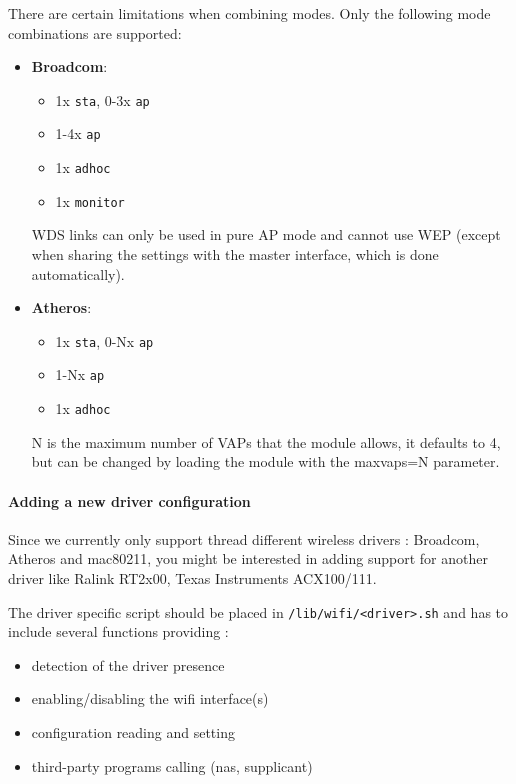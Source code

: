 There are certain limitations when combining modes.
Only the following mode combinations are supported:

\begin{itemize}
    \item \textbf{Broadcom}: \\
        \begin{itemize}
            \item 1x \texttt{sta}, 0-3x \texttt{ap}
            \item 1-4x \texttt{ap}
            \item 1x \texttt{adhoc}
            \item 1x \texttt{monitor}
        \end{itemize}

        WDS links can only be used in pure AP mode and cannot use WEP (except when sharing the
        settings with the master interface, which is done automatically).

    \item \textbf{Atheros}: \\
        \begin{itemize}
            \item 1x \texttt{sta}, 0-Nx \texttt{ap}
            \item 1-Nx \texttt{ap}
            \item 1x \texttt{adhoc}
        \end{itemize}

	N is the maximum number of VAPs that the module allows, it defaults to 4, but can be
	changed by loading the module with the maxvaps=N parameter.
\end{itemize}

\paragraph{Adding a new driver configuration}

Since we currently only support thread different wireless drivers : Broadcom, Atheros and mac80211,
you might be interested in adding support for another driver like Ralink RT2x00, 
Texas Instruments ACX100/111.

The driver specific script should be placed in \texttt{/lib/wifi/<driver>.sh} and has to
include several functions providing :

\begin{itemize}
	\item detection of the driver presence
	\item enabling/disabling the wifi interface(s)
	\item configuration reading and setting
	\item third-party programs calling (nas, supplicant)
\end{itemize}

